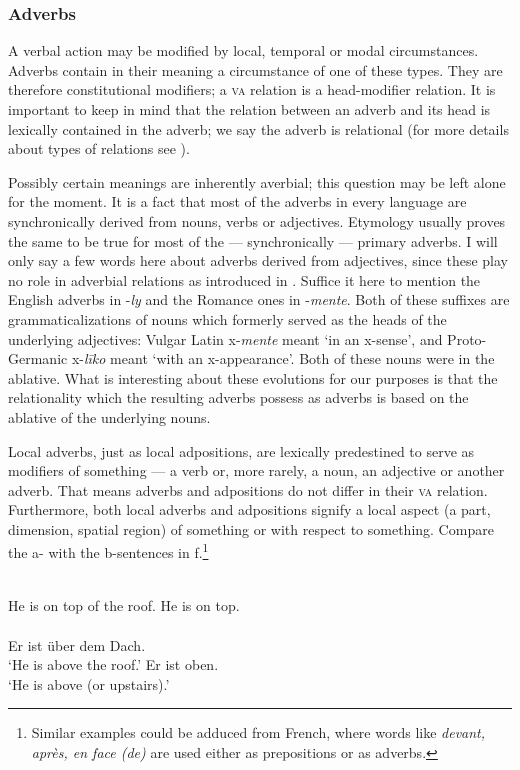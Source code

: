 \subsubsection{Adverbs} \label{sec:3.4.1.4}
A verbal action may be modified by local, temporal or modal circumstances. Adverbs contain in their meaning a circumstance of one of these types. They are therefore constitutional modifiers; a \textsc{va} relation is a head-modifier relation. It is important to keep in mind that the relation between an adverb and its head is lexically contained in the adverb; we say the adverb is relational (for more details about types of relations see \citealt{Lehmann1983}).

Possibly certain meanings are inherently averbial; this question may be left alone for the moment. It is a fact that most of the adverbs in every language are synchronically derived from nouns, verbs or adjectives. Etymology usually proves the same to be true for most of the — synchronically — primary adverbs. I will only say a few words here about adverbs derived from adjectives, since these play no role in adverbial relations as introduced in . Suffice it here to mention the English adverbs in -\textit{ly} and the Romance ones in -\textit{mente}. Both of these suffixes are grammaticalizations of nouns which formerly served as the heads of the underlying adjectives: Vulgar Latin x-\textit{mente} meant ‘in an x-sense’, and Proto-Germanic x-\textit{l\=iko} meant ‘with an x-appearance’. Both of these nouns were in the ablative. What is interesting about these evolutions for our purposes is that the relationality which the resulting adverbs possess as adverbs is based on the ablative of the underlying nouns.

Local adverbs, just as local adpositions, are lexically predestined to serve as modifiers of something — a verb or, more rarely, a noun, an adjective or another adverb. That means adverbs and adpositions do not differ in their \textsc{va} relation. Furthermore, both local adverbs and adpositions signify a local aspect (a part, dimension, spatial region) of something or with respect to something. Compare the a- with the b-sentences in f.\footnote{Similar examples could be adduced from French, where words like \textit{devant, après, en face (de)} are used either as prepositions or as adverbs.}

\ea\label{ex:E62}
 \langinfo{\LangEngl}{}{} \\
\ea He is on top of the roof. 
 \ex  He is on top.  \\
\z
\z
\noindent \ea\label{ex:E63}
\langinfo{\LangGerm}{}{}\\
 \ea Er ist über dem Dach.\\
 \glt ‘He is above the roof.’
\ex  Er ist oben. \\  
	\glt ‘He is above (or upstairs).’
\z
\z
 
